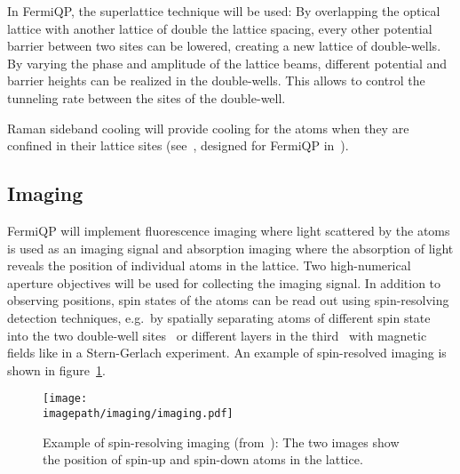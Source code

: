 In FermiQP, the superlattice technique will be used: By overlapping the optical lattice with another lattice of double the lattice spacing, every other potential barrier between two sites can be lowered, creating a new lattice of double-wells. By varying the phase and amplitude of the lattice beams, different potential and barrier heights can be realized in the double-wells. This allows to control the tunneling rate between the sites of the double-well.

Raman sideband cooling will provide cooling for the atoms when they are confined in their lattice sites (see~\cite*{hilker_spin-resolved_2017}, designed for FermiQP in~\cite{krumm_notitle_2022}).

\subsection*{Imaging}
FermiQP will implement fluorescence imaging where light scattered by the atoms is used as an imaging signal and absorption imaging where the absorption of light reveals the position of individual atoms in the lattice. Two high-numerical aperture objectives will be used for collecting the imaging signal. In addition to observing positions, spin states of the atoms can be read out using spin-resolving detection techniques, e.g.~by spatially separating atoms of different spin state into the two double-well sites~\cite{boll_spin-_2016} or different layers in the third~\cite{koepsell_robust_2020} with magnetic fields like in a Stern-Gerlach experiment. An example of spin-resolved imaging is shown in figure~\ref{fig:absorption_image}.

\begin{figure}
    \centering
    \texttt{[image: \\imagepath/imaging/imaging.pdf]}
    \caption{Example of spin-resolving imaging (from~\cite{koepsell_robust_2020}): The two images show the position of spin-up and spin-down atoms in the lattice.}
    \label{fig:absorption_image}
\end{figure}

